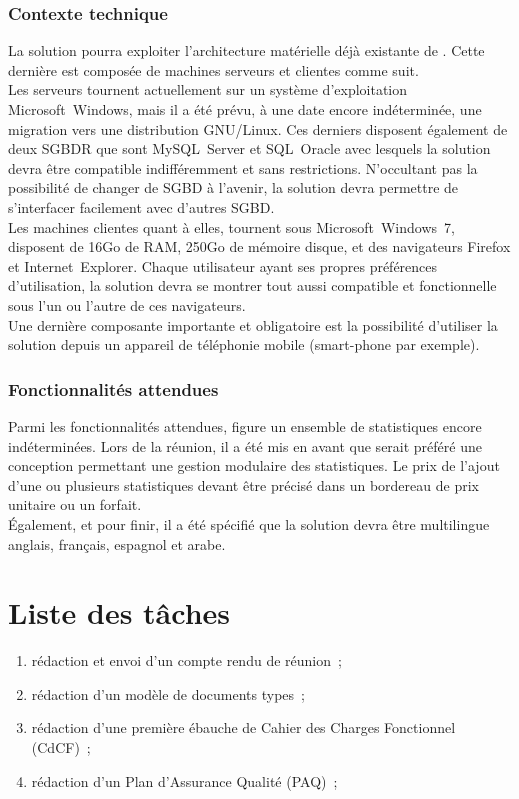 \documentclass[11pt,fleqn]{report}
\begin{document}
\subsubsection{Contexte technique}
La solution pourra exploiter l'architecture matérielle déjà existante de \mo. Cette dernière est composée de machines serveurs et clientes comme suit.
\\
Les serveurs tournent actuellement sur un système d'exploitation Microsoft~Windows, mais il a été prévu, à une date encore indéterminée, une migration vers une distribution GNU/Linux. Ces derniers disposent également de deux SGBDR que sont MySQL~Server et SQL~Oracle avec lesquels la solution devra être compatible indifféremment et sans restrictions. N'occultant pas la possibilité de changer de SGBD à l'avenir, la solution devra permettre de s'interfacer facilement avec d'autres SGBD.
\\
Les machines clientes quant à elles, tournent sous Microsoft~Windows~7, disposent de 16Go de RAM, 250Go de mémoire disque, et des navigateurs Firefox et Internet~Explorer. Chaque utilisateur ayant ses propres préférences d'utilisation, la solution devra se montrer tout aussi compatible et fonctionnelle sous l'un ou l'autre de ces navigateurs.
\\
Une dernière composante importante et obligatoire est la possibilité d'utiliser la solution depuis un appareil de téléphonie mobile (smart-phone par exemple).

\subsubsection{Fonctionnalités attendues}
Parmi les fonctionnalités attendues, figure un ensemble de statistiques encore indéterminées. Lors de la réunion, il a été mis en avant que serait préféré une conception permettant une gestion modulaire des statistiques. Le prix de l'ajout d'une ou plusieurs statistiques devant être précisé dans un bordereau de prix unitaire ou un forfait.
\\
Également, et pour finir, il a été spécifié que la solution devra être multilingue anglais, français, espagnol et arabe.

\section{Liste des tâches}
\begin{enumerate}
	\item rédaction et envoi d'un compte rendu de réunion~;
	\item rédaction d'un modèle de documents types~;
	\item rédaction d'une première ébauche de Cahier des Charges Fonctionnel (CdCF)~;
	\item rédaction d'un Plan d'Assurance Qualité (PAQ)~;
\end{enumerate}
\end{document}
